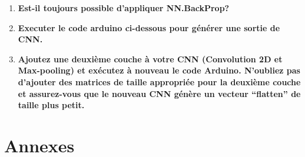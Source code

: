 \documentclass[a4paper, 12pt, openany]{book}
\begin{document}
\begin{enumerate}
{  } 
  \item {
    \textbf{Est-il toujours possible d'appliquer NN.BackProp?} \vspace{0.2cm} \\
  } 
  \item {
    \textbf{Executer le code arduino ci-dessous pour générer une sortie de CNN.} \vspace{0.2cm} \\ 
  } 
  \item {
    \textbf{Ajoutez une deuxième couche à votre CNN (Convolution 2D et Max-pooling) et
    exécutez à nouveau le code Arduino. N'oubliez pas d'ajouter des matrices de taille
    appropriée pour la deuxième couche et assurez-vous que le nouveau CNN génère un
    vecteur ``flatten'' de taille plus petit.} \vspace{0.2cm} \\
  }

\end{enumerate}

\newpage

\appendix

\titleformat{\chapter}[hang]{\LARGE\bfseries}{\textcolor{titlecolor}{}}{0.5em}{\textcolor{titlecolor}}
\chapter{Annexes}\label{annexe}

\end{document}
